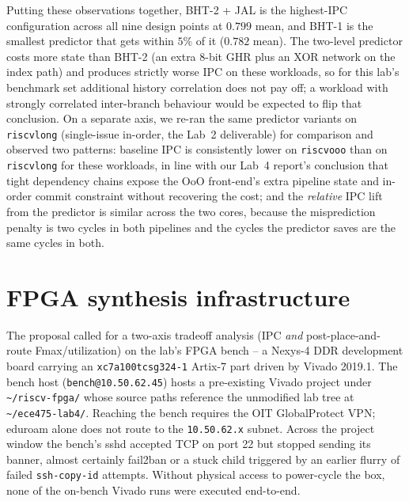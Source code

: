 \documentclass[10pt]{article}
\begin{document}
Putting these observations together, BHT-2 + JAL is the highest-IPC
configuration across all nine design points at $0.799$ mean, and
BHT-1 is the smallest predictor that gets within $5\%$ of it
($0.782$ mean). The two-level predictor costs more state than BHT-2
(an extra 8-bit GHR plus an XOR network on the index path) and
produces strictly worse IPC on these workloads, so for this lab's
benchmark set additional history correlation does not pay off; a
workload with strongly correlated inter-branch behaviour would be
expected to flip that conclusion. On a separate axis, we re-ran the
same predictor variants on \texttt{riscvlong} (single-issue
in-order, the Lab~2 deliverable) for comparison and observed two
patterns: baseline IPC is consistently lower on \texttt{riscvooo}
than on \texttt{riscvlong} for these workloads, in line with our
Lab~4 report's conclusion that tight dependency chains expose the
OoO front-end's extra pipeline state and in-order commit constraint
without recovering the cost; and the \emph{relative} IPC lift from
the predictor is similar across the two cores, because the
misprediction penalty is two cycles in both pipelines and the cycles
the predictor saves are the same cycles in both.

\section{FPGA synthesis infrastructure}
\label{sec:fpga}
\sloppy

The proposal called for a two-axis tradeoff analysis (IPC \emph{and}
post-place-and-route Fmax/utilization) on the lab's FPGA bench -- a
Nexys-4 DDR development board carrying an
\texttt{xc7a100tcsg324-1} Artix-7 part driven by Vivado 2019.1. The
bench host (\texttt{bench@10.50.62.45}) hosts a pre-existing Vivado
project under \texttt{\textasciitilde/riscv-fpga/} whose source paths reference
the unmodified lab tree at \texttt{\textasciitilde/ece475-lab4/}. Reaching the
bench requires the OIT GlobalProtect VPN; eduroam alone does not
route to the \texttt{10.50.62.x} subnet. Across the project window
the bench's sshd accepted TCP on port 22 but stopped sending its
banner, almost certainly fail2ban or a stuck child triggered by an
earlier flurry of failed \texttt{ssh-copy-id} attempts. Without
physical access to power-cycle the box, none of the on-bench Vivado
runs were executed end-to-end.
\end{document}
